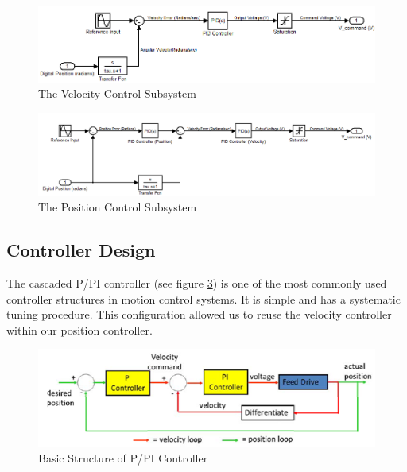 \documentclass{article}
\theoremstyle{plain}
\theoremstyle{definition}
\theoremstyle{remark}
\begin{document}
\begin{figure}[htb]
\begin{center}
\includegraphics[height = 6 cm, width = 18 cm]{q3_5}
\caption{The Velocity Control Subsystem}
\label{q3_5}
\end{center}
\end{figure}

\begin{figure}[htb]
\begin{center}
\includegraphics[height = 6 cm,width = 18 cm]{q3_6}
\caption{The Position Control Subsystem}
\label{q3_6}
\end{center}
\end{figure}

\clearpage

\subsection*{Controller Design}
The cascaded P/PI controller (see figure \ref{q3_7}) is one of the most commonly used controller structures in motion control systems. It is simple and has a systematic tuning procedure. This configuration allowed us to reuse the velocity controller within our position controller.\\

\begin{figure}[htb]
\begin{center}
\includegraphics[width = 14 cm]{q3_7}
\caption{Basic Structure of P/PI Controller}
\label{q3_7}
\end{center}
\end{figure}
\end{document}
